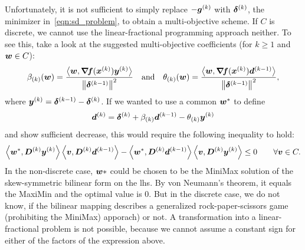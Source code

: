 \documentclass{article}
\theoremstyle{plain}
\theoremstyle{definition}
\begin{document}
Unfortunately, it is not sufficient to simply replace
$-\bm{g}^{(k)}$ with $\bm{\delta}^{(k)}$, the minimizer in~\eqref{eqn:sd_problem},
to obtain a multi-objective scheme.
If $C$ is discrete, we cannot use the linear-fractional programming
approach neither.
To see this, take a look at the suggested multi-objective coefficients
(for $k\geq 1$ and $\bm{w} \in C$):
\begin{equation}
\beta_{(k)}(\bm{w})
=
\frac{
	\left\langle \bm{w}, \bm{\nabla}\!\bm{f}(\bm{x}^{(k)})\bm{y}^{(k)} \right\rangle
}{
	\left\|\bm{\delta}^{(k-1)}\right\|^2
}
\quad\text{and}\quad
\theta_{(k)}(\bm{w})
=
\frac{
	\left\langle \bm{w}, \bm{\nabla}\!\bm{f}(\bm{x}^{(k)})\bm{d}^{(k-1)} \right\rangle
}{
	\left\|\bm{\delta}^{(k-1)}\right\|^2
},
\label{eqn:factorialsPreemergent}
\end{equation}
where $\bm{y}^{(k)} = \bm{\delta}^{(k-1)} - \bm{\delta}^{(k)}$.
If we wanted to use a common $\bm{w}^*$ to define 
$$
\bm{d}^{(k)}
= \bm{\delta}^{(k)}
+ \beta_{(k)} \bm{d}^{(k-1)} - \theta_{(k)} \bm{y}^{(k)}
$$
and show sufficient decrease, 
this would require the following inequality to hold:
$$
\left\langle \bm{w}^*, \bm{D}^{(k)} \bm{y}^{(k)} \right\rangle
\left\langle \bm{v}, \bm{D}^{(k)} \bm{d}^{(k-1)} \right\rangle
-
\left\langle \bm{w}^*, \bm{D}^{(k)} \bm{d}^{(k-1)} \right\rangle
\left\langle \bm{v}, \bm{D}^{(k)} \bm{y}^{(k)} \right\rangle
\leq 0
\qquad \forall \bm{v}\in C.
$$
In the non-discrete case, $\bm{w}*$ could be chosen to be the 
MiniMax solution of the skew-symmetric bilinear form on the \ac{lhs}.
By von Neumann's theorem, it equals the MaxiMin and the optimal value 
is $0$.
But in the discrete case, we do not know, if the bilinear mapping
describes a generalized rock-paper-scissors game (prohibiting the MiniMax)
apporach) or not.
A transformation into a linear-fractional problem is not possible,
because we cannot assume a constant sign for either of the factors 
of the expression above.
\end{document}
